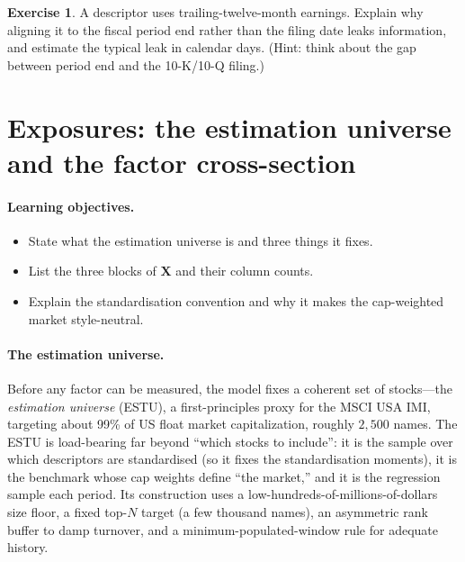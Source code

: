\documentclass[11pt]{article}
\theoremstyle{definition}
\newtheorem{exercise}{Exercise}[section]
\theoremstyle{plain}
\theoremstyle{remark}
\newcommand{\Xmat}{\mathbf{X}}
\begin{document}
\begin{exercise}
A descriptor uses trailing-twelve-month earnings. Explain why aligning it to the fiscal period end rather than the filing date leaks information, and estimate the typical leak in calendar days. (Hint: think about the gap between period end and the 10-K/10-Q filing.)
\end{exercise}

\section{Exposures: the estimation universe and the factor cross-section}\label{sec:expo}

\paragraph{Learning objectives.}
\begin{itemize}[leftmargin=1.4em,nosep]
  \item State what the estimation universe is and three things it fixes.
  \item List the three blocks of $\Xmat$ and their column counts.
  \item Explain the standardisation convention and why it makes the cap-weighted market style-neutral.
\end{itemize}

\paragraph{The estimation universe.} Before any factor can be measured, the model fixes a coherent set of stocks---the \emph{estimation universe} (ESTU), a first-principles proxy for the MSCI USA IMI, targeting about 99\% of US float market capitalization, roughly $2{,}500$ names. The ESTU is load-bearing far beyond ``which stocks to include'': it is the sample over which descriptors are standardised (so it fixes the standardisation moments), it is the benchmark whose cap weights define ``the market,'' and it is the regression sample each period. Its construction uses a low-hundreds-of-millions-of-dollars size floor, a fixed top-$N$ target (a few thousand names), an asymmetric rank buffer to damp turnover, and a minimum-populated-window rule for adequate history.
\end{document}
